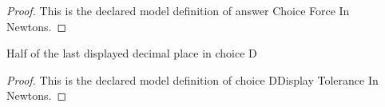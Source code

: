 \begin{proof}
  This is the declared model definition of answer Choice Force In Newtons.
\end{proof}
\begin{definition}
  \label{def:physics:phyx-mini-0839:phyxminiproblems-problemphyxmini0839-choiceddisplaytoleranceinnewtons}
  Half of the last displayed decimal place in choice D
\end{definition}
\begin{proof}
  This is the declared model definition of choice DDisplay Tolerance In Newtons.
\end{proof}
